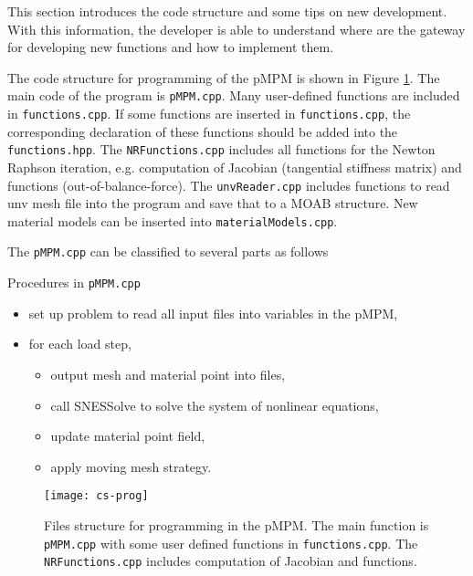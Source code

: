 \documentclass[10pt,a4paper]{article}
\newcommand{\code}[1]{\texttt{#1}}
\begin{document}
This section introduces the code structure and some tips on new development. With this information, the developer is able to understand where are the gateway for developing new functions and how to implement them.  

The code structure for programming of the pMPM is shown in Figure \ref{fig:cs-prog}. The main code of the program is \code{pMPM.cpp}. Many user-defined functions are included in \code{functions.cpp}. If some functions are inserted in \code{functions.cpp}, the corresponding declaration of these functions should be added into the \code{functions.hpp}. The \code{NRFunctions.cpp} includes all functions for the Newton Raphson iteration, e.g. computation of Jacobian (tangential stiffness matrix) and functions (out-of-balance-force). The \code{unvReader.cpp} includes functions to read unv mesh file into the program and save that to a MOAB structure. New material models can be inserted into \code{materialModels.cpp}.

 



The \code{pMPM.cpp} can be classified to several parts as follows
\begin{tip}{Procedures in \code{pMPM.cpp}}
\begin{itemize}
\item set up problem to read all input files into variables in the pMPM,
\item for each load step,
\begin{itemize}
\item output mesh and material point into files,
\item call SNESSolve to solve the system of nonlinear equations, 
\item update material point field,
\item apply moving mesh strategy.
\end{itemize} 

\end{itemize}
\end{tip}


\begin{figure}[!h]
\centering
\texttt{[image: cs-prog]}
\caption{Files structure for programming in the pMPM. The main function is \code{pMPM.cpp} with some user defined functions in \code{functions.cpp}. The \code{NRFunctions.cpp} includes computation of Jacobian and functions.}
\label{fig:cs-prog}
\end{figure}


\clearpage
\end{document}
